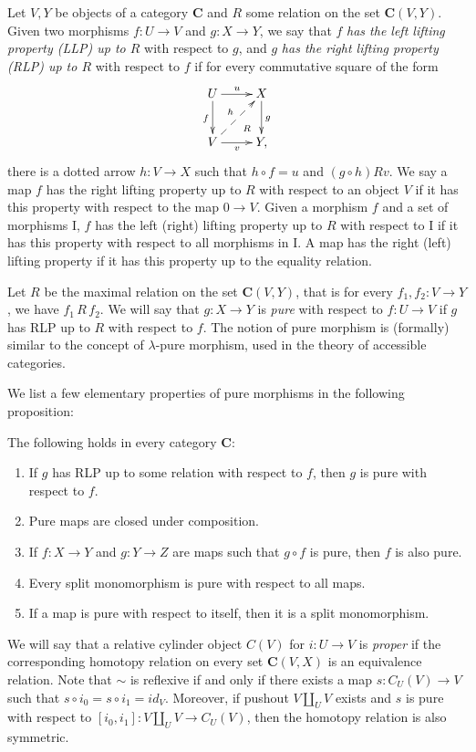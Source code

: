 \documentclass{amsart}
\theoremstyle{definition}
\newcommand{\cat}[1]{\mathbf{#1}}
\newcommand{\C}{\cat{C}}
\newcommand{\I}{\mathrm{I}}
\newcommand{\cyli}{i}
\begin{document}
Let $V,Y$ be objects of a category $\C$ and $R$ some relation on the set $\C(V,Y)$.
Given two morphisms $f : U \to V$ and $g : X \to Y$, we say that $f$ \emph{has the left lifting property (LLP) up to $R$} with respect to $g$,
and $g$ \emph{has the right lifting property (RLP) up to $R$} with respect to $f$ if for every commutative square of the form
\[ \xymatrix{ U \ar[r]^u \ar@{}[dr]|(.7){R} \ar[d]_f & X \ar[d]^g \\
              V \ar[r]_v \ar@{-->}[ur]^h             & Y,
            } \]
there is a dotted arrow $h : V \to X$ such that $h \circ f = u$ and $(g \circ h) R v$.
We say a map $f$ has the right lifting property up to $R$ with respect to
an object $V$ if it has this property with respect to the map $0 \to V$.
Given a morphism $f$ and a set of morphisms $\I$, $f$ has the left (right) lifting property up to $R$
with respect to $\I$ if it has this property with respect to all morphisms in $\I$.
A map has the right (left) lifting property if it has this property up to the equality relation.

Let $R$ be the maximal relation on the set $\C(V,Y)$, that is for every $f_1,f_2 : V \to Y$, we have $f_1\,R\,f_2$.
We will say that $g : X \to Y$ is \emph{pure} with respect to $f : U \to V$ if $g$ has RLP up to $R$ with respect to $f$.
The notion of pure morphism is (formally) similar to the concept of
$\lambda$-pure morphism, used in the theory of accessible categories.

We list a few elementary properties of pure morphisms in the following proposition:

\begin{prop} The following holds in every category $\C$:
\begin{enumerate}
\item If $g$ has RLP up to some relation with respect to $f$, then $g$ is pure with respect to $f$.
\item Pure maps are closed under composition.
\item If $f : X \to Y$ and $g : Y \to Z$ are maps such that $g \circ f$ is pure, then $f$ is also pure.
\item Every split monomorphism is pure with respect to all maps.
\item If a map is pure with respect to itself, then it is a split monomorphism.
\end{enumerate}
\end{prop}

We will say that a relative cylinder object $C(V)$ for $i : U \to V$ is \emph{proper} if the corresponding homotopy relation on every set $\C(V,X)$ is an equivalence relation.
Note that $\sim$ is reflexive if and only if there exists a map $s : C_U(V) \to V$ such that $s \circ \cyli_0 = s \circ \cyli_1 = id_V$.
Moreover, if pushout $V \amalg_U V$ exists and $s$ is pure with respect to $[\cyli_0,\cyli_1] : V \amalg_U V \to C_U(V)$, then the homotopy relation is also symmetric.
\end{document}
